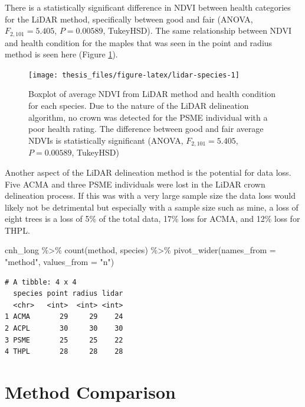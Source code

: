 \documentclass[12pt,twoside]{reedthesis}
\newenvironment{Shaded}{\begin{snugshade}}{\end{snugshade}}
\newcommand{\AttributeTok}[1]{\textcolor[rgb]{0.77,0.63,0.00}{#1}}
\newcommand{\FunctionTok}[1]{\textcolor[rgb]{0.00,0.00,0.00}{#1}}
\newcommand{\NormalTok}[1]{#1}
\newcommand{\SpecialCharTok}[1]{\textcolor[rgb]{0.00,0.00,0.00}{#1}}
\newcommand{\StringTok}[1]{\textcolor[rgb]{0.31,0.60,0.02}{#1}}
\begin{document}
There is a statistically significant difference in NDVI between health categories for the LiDAR method, specifically between good and fair (ANOVA, \(F_{2,101} = 5.405\), \(P = 0.00589\), TukeyHSD). The same relationship between NDVI and health condition for the maples that was seen in the point and radius method is seen here (Figure \ref{fig:lidar-species}).
\begin{figure}
\texttt{[image: thesis\_files/figure-latex/lidar-species-1]} \caption[NDVI and health condition for LiDAR method]{Boxplot of average NDVI from LiDAR method and health condition for each species. Due to the nature of the LiDAR delineation algorithm, no crown was detected for the PSME individual with a poor health rating. The difference between good and fair average NDVIs is statistically significant (ANOVA, $F_{2,101} = 5.405$, $P = 0.00589$, TukeyHSD)}\label{fig:lidar-species}
\end{figure}
Another aspect of the LiDAR delineation method is the potential for data loss. Five ACMA and three PSME individuals were lost in the LiDAR crown delineation process. If this was with a very large sample size the data loss would likely not be detrimental but especially with a sample size such as mine, a loss of eight trees is a loss of 5\% of the total data, 17\% loss for ACMA, and 12\% loss for THPL.
\begin{Shaded}
\begin{Highlighting}[]
\NormalTok{cnh\_long }\SpecialCharTok{\%\textgreater{}\%}
    \FunctionTok{count}\NormalTok{(method, species) }\SpecialCharTok{\%\textgreater{}\%}
    \FunctionTok{pivot\_wider}\NormalTok{(}\AttributeTok{names\_from =} \StringTok{"method"}\NormalTok{, }\AttributeTok{values\_from =} \StringTok{"n"}\NormalTok{)}
\end{Highlighting}
\end{Shaded}
\begin{verbatim}
# A tibble: 4 x 4
  species point radius lidar
  <chr>   <int>  <int> <int>
1 ACMA       29     29    24
2 ACPL       30     30    30
3 PSME       25     25    22
4 THPL       28     28    28
\end{verbatim}
\hypertarget{method-comparison}{%
\section{Method Comparison}\label{method-comparison}}
\end{document}
